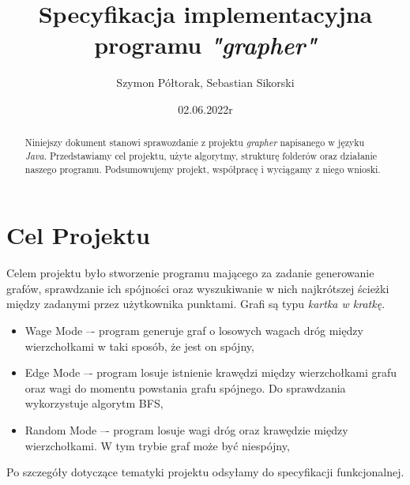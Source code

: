 \documentclass[10pt, a4paper]{report}
\title{\huge{\textbf{Specyfikacja implementacyjna} \\ programu
      \textit{"grapher"}}}
\author{Szymon Półtorak, Sebastian Sikorski}
\date{02.06.2022r}
\begin{document}
\maketitle
\lstset{style=listings}

\begin{abstract}
  Niniejszy dokument stanowi sprawozdanie z projektu \textit{grapher}
  napisanego w języku \textit{Java}.
  Przedstawiamy cel projektu, użyte algorytmy, strukturę folderów oraz
  działanie naszego programu. Podsumowujemy projekt, współpracę i wyciągamy z
  niego wnioski.
\end{abstract}

\renewcommand*\thesection{\arabic{section}}

\pagestyle{fancy}
\fancyhf{}

\tableofcontents
\newpage

\section{Cel Projektu}\label{sec:cel-projektu}
Celem projektu było stworzenie programu mającego za zadanie generowanie grafów,
sprawdzanie ich spójności oraz wyszukiwanie w nich najkrótszej ścieżki między
zadanymi przez użytkownika punktami.
Grafi są typu \textit{kartka w kratkę}.
\begin{itemize}
  \item Wage Mode –- program generuje graf o losowych wagach dróg między
        wierzchołkami w taki sposób, że jest on spójny,
  \item Edge Mode –- program losuje istnienie krawędzi między wierzchołkami
        grafu oraz wagi do momentu powstania
        grafu spójnego. Do sprawdzania wykorzystuje algorytm BFS,
  \item Random Mode –- program losuje wagi dróg oraz krawędzie między
        wierzchołkami. W tym trybie graf może być niespójny,
\end{itemize}
Po szczegóły dotyczące tematyki projektu odsyłamy do specyfikacji
funkcjonalnej.
\end{document}
